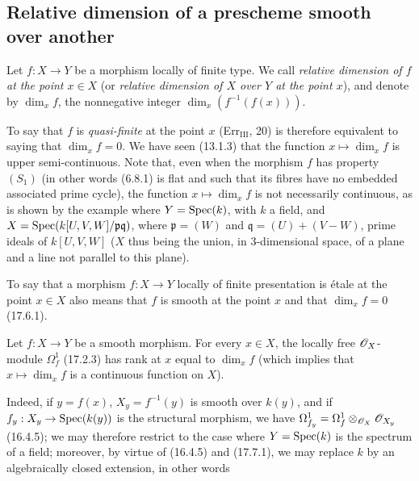 \subsection{Relative dimension of a prescheme smooth over another}

\begin{definition}[17.10.1]\label{IV.17.10.1}
Let $f:X\to Y$ be a morphism locally of finite type. We call \emph{relative dimension of $f$ at the point $x\in X$} (or \emph{relative dimension of $X$ over $Y$ at the point $x$}), and denote by $\dim_x f$, the nonnegative integer $\dim_x(f^{-1}(f(x)))$.
\end{definition}

To say that $f$ is \emph{quasi-finite} at the point $x$ (Err$_{\mathrm{III}}$, 20) is therefore equivalent to saying that $\dim_x f=0$. We have seen (13.1.3) that the function $x\mapsto\dim_x f$ is upper semi-continuous. Note that, even when the morphism $f$ has property $(S_1)$ (in other words (6.8.1) is flat and such that its fibres have no embedded associated prime cycle), the function $x\mapsto\dim_x f$ is not necessarily continuous, as is shown by the example where $Y=\operatorname{Spec}(k)$, with $k$ a field, and $X=\operatorname{Spec}(k[U,V,W]/\mathfrak p\mathfrak q)$, where $\mathfrak p=(W)$ and $\mathfrak q=(U)+(V-W)$, prime ideals of $k[U,V,W]$ ($X$ thus being the union, in 3-dimensional space, of a plane and a line not parallel to this plane).

To say that a morphism $f:X\to Y$ locally of finite presentation is étale at the point $x\in X$ also means that $f$ is smooth at the point $x$ and that $\dim_x f=0$ (17.6.1).

\begin{proposition}[17.10.2]
\label{IV.17.10.2}
Let $f:X\to Y$ be a smooth morphism. For every $x\in X$, the locally free $\mathscr{O}_X$-module $\Omega_f^1$ (17.2.3) has rank at $x$ equal to $\dim_x f$ (which implies that $x\mapsto\dim_x f$ is a continuous function on $X$).
\end{proposition}

Indeed, if $y=f(x)$, $X_y=f^{-1}(y)$ is smooth over $k(y)$, and if $f_y:X_y\to\operatorname{Spec}(k(y))$ is the structural morphism, we have $\Omega_{f_y}^1=\Omega_f^1\otimes_{\mathscr{O}_X}\mathscr{O}_{X_y}$ (16.4.5); we may therefore restrict to the case where $Y=\operatorname{Spec}(k)$ is the spectrum of a field; moreover, by virtue of (16.4.5) and (17.7.1), we may replace $k$ by an algebraically closed extension, in other words


